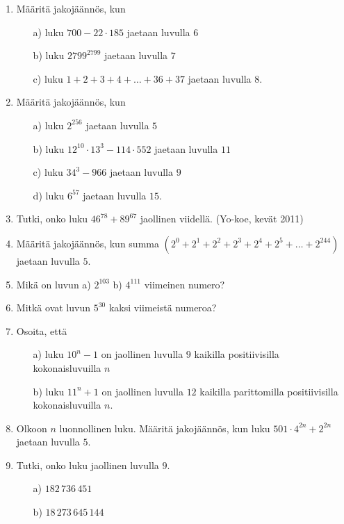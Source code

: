 \begin{enumerate}

\item Määritä jakojäännös, kun
\begin{itemize}
\item[a)] luku $700 - 22 \cdot 185$ jaetaan luvulla $6$
\item[b)] luku $2799^{2799}$ jaetaan luvulla $7$
\item[c)] luku $1+2+3+4+ \ldots + 36 + 37$ jaetaan luvulla $8$.
\end{itemize}

\item Määritä jakojäännös, kun
\begin{itemize}
\item[a)] luku $2^{256}$ jaetaan luvulla $5$
\item[b)] luku $12^{10} \cdot 13^{3} - 114 \cdot 552$ jaetaan luvulla $11$
\item[c)] luku $34^{3} - 966$ jaetaan luvulla $9$
\item[d)] luku $6^{57}$ jaetaan luvulla $15$.
\end{itemize}


\item
Tutki, onko luku $46^{78} + 89^{67}$ jaollinen viidellä. (Yo-koe, kevät 2011)

\item Määritä jakojäännös, kun summa $(2^0 + 2^1 + 2^2 + 2^3 + 2^4 + 2^5 + \ldots + 2^{244})$ jaetaan luvulla $5$.

\item Mikä on luvun a) $2^{103}$  b) $4^{111}$ viimeinen numero?

\item Mitkä ovat luvun $5^{30}$ kaksi viimeistä numeroa?

\item Osoita, että
\begin{itemize}
\item[a)] luku $10^n - 1$ on jaollinen luvulla $9$ kaikilla positiivisilla kokonaisluvuilla $n$
\item[b)] luku $11^n + 1$ on jaollinen luvulla $12$ kaikilla parittomilla positiivisilla kokonaisluvuilla $n$.
\end{itemize}

\item Olkoon $n$ luonnollinen luku. Määritä jakojäännös, kun luku $501 \cdot 4^{2n} + 2^{2n}$ jaetaan luvulla $5$.

\item
Tutki, onko luku jaollinen luvulla $9$.
\begin{itemize}
\item[a)] $182\, 736\, 451$
\item[b)] $18\, 273\, 645\, 144$
\end{itemize}


\end{enumerate}
